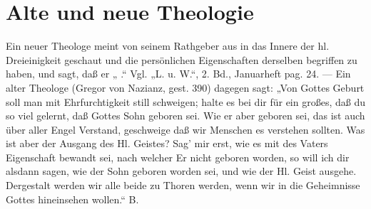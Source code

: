 \chapter{Alte und neue Theologie}

Ein neuer Theologe meint von seinem Rathgeber aus in das Innere der hl. Dreieinigkeit geschaut und die persönlichen Eigenschaften derselben begriffen zu haben, und sagt, daß er
„
.“ Vgl. „L. u. W.“, 2. Bd., Januarheft pag. 24. — Ein alter Theologe (Gregor von Nazianz, gest. 390) dagegen sagt: „Von Gottes Geburt soll man mit Ehrfurchtigkeit still schweigen; halte es bei dir für ein großes, daß du so viel gelernt, daß Gottes Sohn geboren sei. Wie er aber geboren sei, das ist auch über aller Engel Verstand, geschweige daß wir Menschen es verstehen sollten. Was ist aber der Ausgang des Hl. Geistes? Sag’ mir erst, wie es mit des Vaters Eigenschaft bewandt sei, nach welcher Er nicht geboren worden, so will ich dir alsdann sagen, wie der Sohn geboren worden sei, und wie der Hl. Geist ausgehe. Dergestalt werden wir alle beide zu Thoren werden, wenn wir in die Geheimnisse Gottes hineinsehen wollen.“ B.
